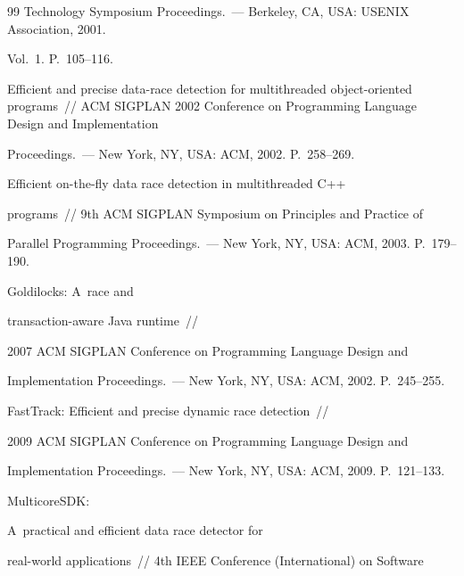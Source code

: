 {{\begin{thebibliography}{99}
Technology Symposium Proceedings.~--- Berkeley, CA, USA: USENIX Association, 2001.

Vol.~1. P.~105--116.








 Efficient and precise data-race detection for multithreaded object-oriented programs~/\!\!/ ACM SIGPLAN 2002 Conference on Programming Language Design and Implementation

Proceedings.~--- New York, NY, USA: ACM, 2002. P.~258--269.




 Efficient on-the-fly data race detection in multithreaded C++

programs~/\!\!/ 9th ACM SIGPLAN Symposium on Principles and Practice of

Parallel Programming Proceedings.~--- New York, NY, USA: ACM, 2003. P.~179--190.






 Goldilocks: A~race and

transaction-aware Java runtime~/\!\!/

2007 ACM SIGPLAN Conference on Programming Language Design and

Implementation Proceedings.~--- New York, NY, USA: ACM, 2002. P.~245--255.




 FastTrack: Efficient and precise dynamic race detection~/\!\!/

2009 ACM SIGPLAN Conference on Programming Language Design and

Implementation Proceedings.~--- New York, NY, USA: ACM, 2009. P.~121--133.






 MulticoreSDK:

A~practical and efficient data race detector for

real-world applications~/\!\!/ 4th IEEE  Conference (International) on Software


\end{thebibliography}}}
